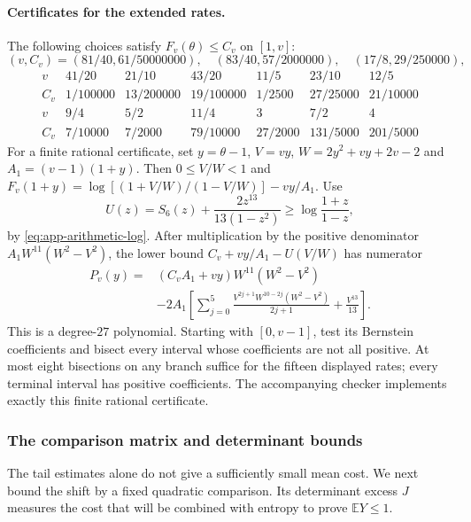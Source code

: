 \documentclass[11pt,a4paper]{article}
\numberwithin{equation}{section}
\begin{document}
\paragraph{Certificates for the extended rates.}
The following choices satisfy $F_v(\theta)\le C_v$ on $[1,v]$:
\[
 (v,C_v)=(81/40,61/50000000),\quad
 (83/40,57/2000000),\quad(17/8,29/250000),
\]
\[
\begin{array}{c|rrrrrr}
 v&41/20&21/10&43/20&11/5&23/10&12/5\\\hline
 C_v&1/100000&13/200000&19/100000&1/2500&27/25000&21/10000\\[1mm]
 v&9/4&5/2&11/4&3&7/2&4\\\hline
 C_v&7/10000&7/2000&79/10000&27/2000&131/5000&201/5000
\end{array}
\]
For a finite rational certificate, set $y=\theta-1$, $V=vy$,
$W=2y^2+vy+2v-2$ and $A_1=(v-1)(1+y)$.
Then $0\le V/W<1$ and
$F_v(1+y)=\log[(1+V/W)/(1-V/W)]-vy/A_1$.
Use
\[
 U(z)=S_6(z)+\frac{2z^{13}}{13(1-z^2)}
 \ge\log\frac{1+z}{1-z},
\]
by \eqref{eq:app-arithmetic-log}. After multiplication by the positive denominator
$A_1W^{11}(W^2-V^2)$, the lower bound
$C_v+vy/A_1-U(V/W)$ has numerator
\[
 \begin{split}
 P_v(y)={}&(C_vA_1+vy)W^{11}(W^2-V^2)\\
 &-2A_1\left[
 \sum_{j=0}^{5}\frac{V^{2j+1}W^{10-2j}(W^2-V^2)}{2j+1}
             +\frac{V^{13}}{13}\right].
 \end{split}
\]
This is a degree-$27$ polynomial. Starting with $[0,v-1]$, test its
Bernstein coefficients and bisect every interval whose coefficients
are not all positive. At most eight bisections on any branch suffice
for the fifteen displayed rates; every terminal interval has positive
coefficients. The accompanying checker implements exactly this finite
rational certificate.

\subsubsection{The comparison matrix and determinant bounds}
The tail estimates alone do not give a sufficiently small mean cost.
We next bound the shift by a fixed quadratic comparison. Its determinant
excess $J$ measures the cost that will be combined with entropy to prove
$\mathbb EY\le1$.
\end{document}
